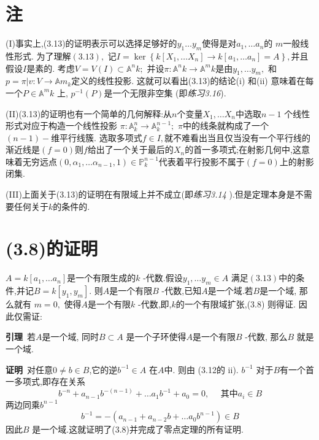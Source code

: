 \documentclass[UTF8]{book}
\begin{document}
		
		
	\section{注}
		(I)事实上,(3.13)的证明表示可以选择足够好的$y_{1} \ldots y_{m}$使得是对$a_{1}, \dots a_{n}$的 $m$一般线性形式. 为了理解$(3.13),$ 记$I = \ker \left\{ k \left[ X _{1}, \ldots X _{ n }\right] \rightarrow k \left[ a _{1}, \ldots a _{ n }\right]= A \right\},$并且假设$ I $是素的. 考虑$V = V (I ) \subset \mathbb{A} ^{ n } k ;$ 并设$\pi: \mathbb{A} ^{ n } k \rightarrow \mathbb{A} ^{ m } k$是由$y_{1}, \dots y_{m},$ 和 $p=\pi | v: V \rightarrow \mathbb{A} m_{k}$定义的线性投影. 这就可以看出(3.13)的结论(i) 和(ii)  意味着在每一个$P \in \mathbb{A} ^{ m } k $ 上, $ p ^{-1}(P )$是一个无限非空集 (即\textit{练习3.16}). 
		
		
		(II)(3.13)的证明也有一个简单的几何解释:从$ n $个变量$X _{1}, \ldots X _{ n }$中选取$n -1$ 个线性形式对应于构造一个线性投影 $\pi: \mathbb{A} ^{n}_{k} \rightarrow \mathbb{A} ^{n-1}_{k} ;$ $\pi$中的线条就构成了一个 $(n-1)-$维平行线簇. 选取多项式$f \in I ,$就不难看出当且仅当没有一个平行线的渐近线是$ (f = 0) $则$f$给出了一个关于最后的$X_{n}$的首一多项式;在射影几何中,这意味着无穷远点$\left(0, \alpha_{1}, \dots \alpha_{n-1}, 1\right) \in \mathbb{P} ^{n-1}_{k}$代表着平行投影不属于$ (f = 0) $上的射影闭集.
		
		
		(III)上面关于(3.13)的证明在有限域上并不成立(即\textit{练习3.14 }).但是定理本身是不需要任何关于$ k $的条件的.
		
		
	\section{(3.8)的证明}
		$A=k\left[a_{1}, \ldots a_{n}\right]$是一个有限生成的$k$ -代数.假设$y _{1}, \ldots y _{ m } \in A$ 满足$(3.13)$中的条件,并记$B = k \left[ y _{1}, y _{ m }\right] .$ 则$A$是一个有限$B$ -代数,已知$A$是一个域.若$B$是一个域, 那么就有 $m =0,$ 使得$A$是一个有限$k$ -代数,即,$k $的一个有限域扩张,(3.8) 则得证. 因此仅需证:
		
		\textbf{引理}\ 若$A$是一个域, 同时$B \subset A$ 是一个子环使得$A$是一个有限$B$ -代数, 那么$B$ 就是一个域.
		
		\textbf{证明}\ 对任意$0 \neq b \in B$,它的逆$b ^{-1} \in A$ 在$ A $中. 则由 (3.12的 ii). $b ^{-1}$ 对于$B$有一个首一多项式,即存在关系
		\begin{equation*}
		b ^{- n }+ a _{ n -1} b ^{-(n -1)}+\ldots a _{1} b ^{-1}+ a _{0}=0, \quad \text { 其中} a _{ i } \in B
		\end{equation*}
		两边同乘$b ^{ n -1}$
		\begin{equation*}
		b ^{-1}=-\left(a _{ n -1}+ a _{ n -2} b +\ldots a _{0} b ^{ n -1}\right) \in B
		\end{equation*}
		因此$B$ 是一个域.这就证明了(3.8)并完成了零点定理的所有证明.
		
\end{document}
